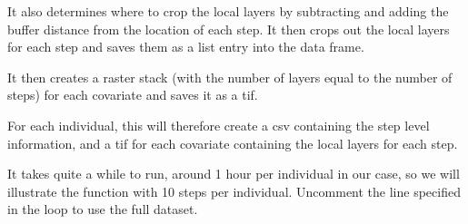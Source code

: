\documentclass[
  letterpaper,
  DIV=11,
  numbers=noendperiod]{scrartcl}
\begin{document}
It also determines where to crop the local layers by subtracting and
adding the buffer distance from the location of each step. It then crops
out the local layers for each step and saves them as a list entry into
the data frame.

It then creates a raster stack (with the number of layers equal to the
number of steps) for each covariate and saves it as a tif.

For each individual, this will therefore create a csv containing the
step level information, and a tif for each covariate containing the
local layers for each step.

It takes quite a while to run, around 1 hour per individual in our case,
so we will illustrate the function with 10 steps per individual.
Uncomment the line specified in the loop to use the full dataset.
\end{document}
